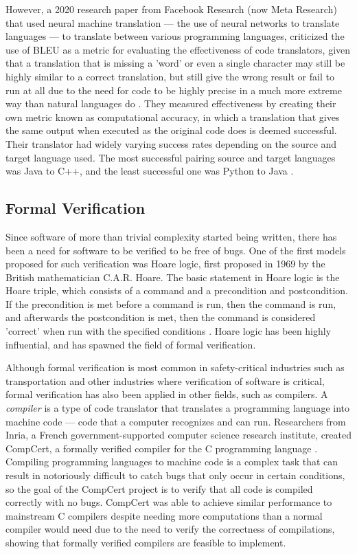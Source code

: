 However, a 2020 research paper from Facebook Research (now Meta Research) that used neural machine translation --- the use of neural networks to translate languages --- to translate between various programming languages, criticized the use of BLEU as a metric for evaluating the effectiveness of code translators, given that a translation that is missing a 'word' or even a single character may still be highly similar to a correct translation, but still give the wrong result or fail to run at all due to the need for code to be highly precise in a much more extreme way than natural languages do \autocite{Roziere}. They measured effectiveness by creating their own metric known as computational accuracy, in which a translation that gives the same output when executed as the original code does is deemed successful. Their translator had widely varying success rates depending on the source and target language used. The most successful pairing source and target languages was Java to C++, and the least successful one was Python to Java \autocite{Roziere}.

\subsection{Formal Verification}
Since software of more than trivial complexity started being written, there has been a need for software to be verified to be free of bugs. One of the first models proposed for such verification was Hoare logic, first proposed in 1969 by the British mathematician C.A.R. Hoare. The basic statement in Hoare logic is the Hoare triple, which consists of a command and a precondition and postcondition. If the precondition is met before a command is run, then the command is run, and afterwards the postcondition is met, then the command is considered 'correct' when run with the specified conditions \autocite{Hoare}. Hoare logic has been highly influential, and has spawned the field of formal verification.

Although formal verification is most common in safety-critical industries such as transportation and other industries where verification of software is critical, formal verification has also been applied in other fields, such as compilers. A \textit{compiler} is a type of code translator that translates a programming language into machine code --- code that a computer recognizes and can run. Researchers from Inria, a French government-supported computer science research institute, created CompCert, a formally verified compiler for the C programming language \autocite{Leroy}. Compiling programming languages to machine code is a complex task that can result in notoriously difficult to catch bugs that only occur in certain conditions, so the goal of the CompCert project is to verify that all code is compiled correctly with no bugs. CompCert was able to achieve similar performance to mainstream C compilers despite needing more computations than a normal compiler would need due to the need to verify the correctness of compilations, showing that formally verified compilers are feasible to implement.

